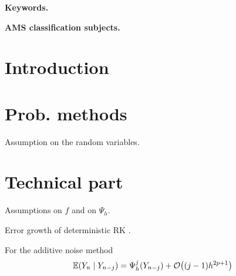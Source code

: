 \documentclass[10pt]{article}
\begin{document}
\maketitle	

\begin{abstract}
\end{abstract}

\textbf{Keywords.}

\textbf{AMS classification subjects.}


\section{Introduction}

\section{Prob. methods}

\begin{assumption}\label{ass:RVs} Assumption on the random variables.
\end{assumption}

\section{Technical part}

\begin{assumption} Assumptions on $f$ and on $\Psi_h$.
\end{assumption}

\begin{theorem} Error growth of deterministic RK \cite{CaH95b}. 
\end{theorem}

\begin{lemma}\label{lem:CondExp} For the additive noise method
	\begin{equation}
		\operatorname{\mathbb{E}}(Y_n \mid Y_{n-j}) = \Psi_h^j(Y_{n-j}) + \mathcal{O}\big((j-1)h^{2p+1}\big)
	\end{equation}
\end{lemma}
\end{document}
